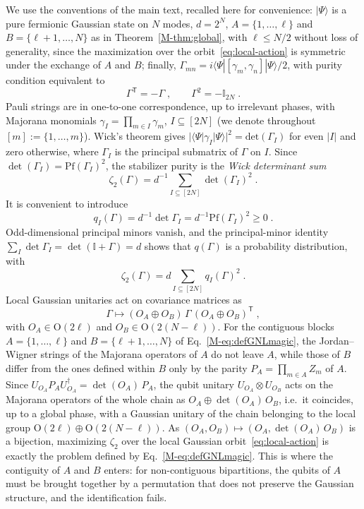 \documentclass[aps,prl,twocolumn,superscriptaddress,reprint,longbibliography,nofootinbib]{revtex4-2}
\newcommand{\trans}{\mathsf{T}}
\begin{document}
We use the conventions of the main text, recalled here for convenience: $|\Psi\rangle$ is a pure fermionic Gaussian state on $N$ modes, $d=2^N$, $A=\{1,\dots,\ell\}$ and $B=\{\ell+1,\dots,N\}$ as in Theorem~\ref{M-thm:global}, with $\ell\le N/2$ without loss of generality, since the maximization over the orbit~\eqref{eq:local-action} is symmetric under the exchange of $A$ and $B$; finally, $\Gamma_{mn}=i\langle\Psi|[\gamma_m,\gamma_n]|\Psi\rangle/2$, with purity condition equivalent to
\begin{equation}
    \Gamma^{\trans}=-\Gamma\;,\qquad \Gamma^2=-\mathbb{I}_{2N}\;.
    \label{eq:pure-covariance}
\end{equation}
Pauli strings are in one-to-one correspondence, up to irrelevant phases, with Majorana monomials $\gamma_I=\prod_{m\in I}\gamma_m$, $I\subseteq[2N]$ (we denote throughout $[m]:=\{1,\dots,m\}$). Wick's theorem gives $|\langle\Psi|\gamma_I|\Psi\rangle|^2=\mathrm{det}(\Gamma_I)$ for even $|I|$ and zero otherwise, where $\Gamma_I$ is the principal submatrix of $\Gamma$ on $I$. Since $\det(\Gamma_I)=\mathrm{Pf}(\Gamma_I)^2$, the stabilizer purity is the \emph{Wick determinant sum}
\begin{equation}
    \zeta_2(\Gamma)=d^{-1}\sum_{I\subseteq[2N]}\det(\Gamma_I)^2\;.
    \label{eq:zeta-M}
\end{equation}
It is convenient to introduce
\begin{equation}
    q_I(\Gamma)=d^{-1}\det\Gamma_I=d^{-1}\mathrm{Pf}(\Gamma_I)^2\ge 0\;.
    \label{eq:q-definition}
\end{equation}
Odd-dimensional principal minors vanish, and the principal-minor identity $\sum_I\det\Gamma_I=\det(\mathbb{I}+\Gamma)=d$ shows that $q(\Gamma)$ is a probability distribution, with
\begin{equation}
    \zeta_2(\Gamma)=d\sum_{I\subseteq[2N]} q_I(\Gamma)^2\;.
    \label{eq:q-collision}
\end{equation}
Local Gaussian unitaries act on covariance matrices as
\begin{equation}
    \Gamma\longmapsto (O_A\oplus O_B)\,\Gamma\,(O_A\oplus O_B)^{\trans}\;,
    \label{eq:local-action}
\end{equation}
with $O_A\in\mathrm{O}(2\ell)$ and $O_B\in\mathrm{O}(2(N-\ell))$. For the contiguous blocks $A=\{1,\dots,\ell\}$ and $B=\{\ell+1,\dots,N\}$ of Eq.~\eqref{M-eq:defGNLmagic}, the Jordan--Wigner strings of the Majorana operators of $A$ do not leave $A$, while those of $B$ differ from the ones defined within $B$ only by the parity $P_A=\prod_{m\in A}Z_m$ of $A$. Since $U_{O_A}P_AU_{O_A}^\dagger=\det(O_A)\,P_A$, the qubit unitary $U_{O_A}\otimes U_{O_B}$ acts on the Majorana operators of the whole chain as $O_A\oplus\det(O_A)\,O_B$, i.e.\ it coincides, up to a global phase, with a Gaussian unitary of the chain belonging to the local group $\mathrm{O}(2\ell)\oplus\mathrm{O}(2(N-\ell))$. As $(O_A,O_B)\mapsto(O_A,\det(O_A)\,O_B)$ is a bijection, maximizing $\zeta_2$ over the local Gaussian orbit~\eqref{eq:local-action} is exactly the problem defined by Eq.~\eqref{M-eq:defGNLmagic}. This is where the contiguity of $A$ and $B$ enters: for non-contiguous bipartitions, the qubits of $A$ must be brought together by a permutation that does not preserve the Gaussian structure, and the identification fails.
\end{document}
